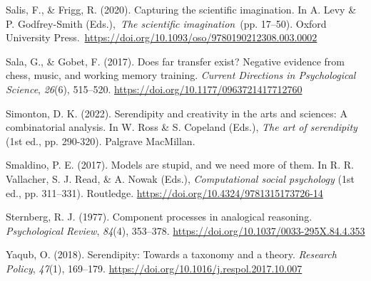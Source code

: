 \documentclass[authordate, commentary]{jote-new-article}
\begin{document}
	Salis, F., \& Frigg, R. (2020). Capturing the scientific imagination. In A. Levy \& P. Godfrey-Smith (Eds.), \emph{The scientific imagination} (pp. 17--50). Oxford University Press. \url{https://doi.org/10.1093/oso/9780190212308.003.0002}



	Sala, G., \& Gobet, F. (2017). Does far transfer exist? Negative evidence from chess, music, and working memory training. \emph{Current Directions in Psychological Science}, \emph{26}(6), 515--520. \url{https://doi.org/10.1177/0963721417712760}



	Simonton, D. K. (2022). Serendipity and creativity in the arts and sciences: A combinatorial analysis. In W. Ross \& S. Copeland (Eds.), \emph{The art of serendipity }(1st ed., pp. 290-320). Palgrave MacMillan.



	Smaldino, P. E. (2017). Models are stupid, and we need more of them. In R. R. Vallacher, S. J. Read, \& A. Nowak (Eds.), \emph{Computational social psychology} (1st ed., pp. 311--331). Routledge. \url{https://doi.org/10.4324/9781315173726-14}



	Sternberg, R. J. (1977). Component processes in analogical reasoning. \emph{Psychological Review}, \emph{84}(4), 353--378. \url{https://doi.org/10.1037/0033-295X.84.4.353}



	Yaqub, O. (2018). Serendipity: Towards a taxonomy and a theory. \emph{Research Policy}, \emph{47}(1), 169--179. \url{https://doi.org/10.1016/j.respol.2017.10.007}
\end{document}
